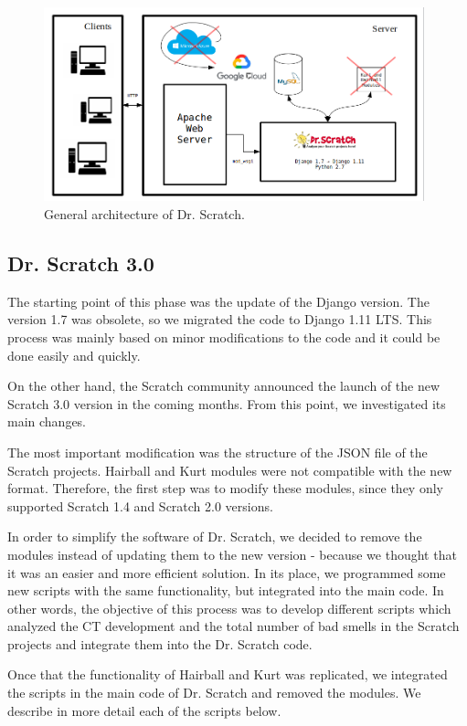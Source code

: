  \begin{figure}
    \centering
    \includegraphics[width=11cm,                         keepaspectratio]{img/Client_Server.png}
    \caption{General architecture of Dr. Scratch.}
    \label{fig:architecture}
\end{figure}


\subsection{Dr. Scratch 3.0}
\label{subsec:newversion}

The starting point of this phase was the update of the Django version. The version 1.7 was obsolete, so we migrated the code to Django 1.11 LTS. This process was mainly based on minor modifications to the code and it could be done easily and quickly.

On the other hand, the Scratch community announced the launch of the new Scratch 3.0 version in the coming months. From this point, we investigated its main changes. 

The most important modification was the structure of the JSON file of the Scratch projects. Hairball and Kurt modules were not compatible with the new format. Therefore, the first step was to modify these modules, since they only supported Scratch 1.4 and Scratch 2.0 versions. 

In order to simplify the software of Dr. Scratch, we decided to remove the modules instead of updating them to the new version - because we thought that it was an easier and more efficient solution. In its place, we programmed some new scripts with the same functionality, but integrated into the main code. In other words, the objective of this process was to develop different scripts which analyzed the CT development and the total number of bad smells in the Scratch projects and integrate them into the Dr. Scratch code.

Once that the functionality of Hairball and Kurt was replicated, we integrated the scripts in the main code of Dr. Scratch and removed the modules. We describe in more detail each of the scripts below. 

